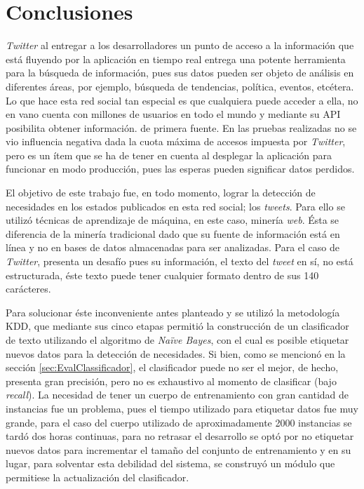 \chapter{Conclusiones}
\label{cap:conclusiones}

\textit{Twitter} al entregar a los desarrolladores un punto de acceso a la información que está fluyendo por la aplicación en tiempo real entrega una potente herramienta para la búsqueda de información, pues sus datos pueden ser objeto de análisis en diferentes áreas, por ejemplo, búsqueda de tendencias, política, eventos, etcétera. Lo que hace esta red social tan especial es que cualquiera puede acceder a ella, no en vano cuenta con millones de usuarios en todo el mundo y mediante su API posibilita obtener información. de primera fuente. En las pruebas realizadas no se vio influencia negativa dada la cuota máxima de accesos impuesta por \textit{Twitter}, pero es un ítem que se ha de tener en cuenta al desplegar la aplicación para funcionar en modo producción, pues las esperas pueden significar datos perdidos.

El objetivo de este trabajo fue, en todo momento, lograr la detección de necesidades en los estados publicados en esta red social; los \textit{tweets}. Para ello se utilizó técnicas de aprendizaje de máquina, en este caso, minería \textit{web}. Ésta se diferencia de la minería tradicional dado que su fuente de información está en línea y no en bases de datos almacenadas para ser analizadas. Para el caso de \textit{Twitter}, presenta un desafío pues su información, el texto del \textit{tweet} en sí, no está estructurada, éste texto puede tener cualquier formato dentro de sus 140 carácteres. 

Para solucionar éste inconveniente antes planteado y se utilizó la metodología KDD, que mediante sus cinco etapas permitió la construcción de un clasificador de texto utilizando el algoritmo de \textit{Naïve Bayes}, con el cual es posible etiquetar nuevos datos para la detección de necesidades. Si bien, como se mencionó en la sección \ref{sec:EvalClassificador}, el clasificador puede no ser el mejor, de hecho, presenta gran precisión, pero no es exhaustivo al momento de clasificar (bajo \textit{recall}). La necesidad de tener un cuerpo de entrenamiento con gran cantidad de instancias fue un problema, pues el tiempo utilizado para etiquetar datos fue muy grande, para el caso del cuerpo utilizado de aproximadamente 2000 instancias se tardó dos horas continuas, para no retrasar el desarrollo se optó por no etiquetar nuevos datos para incrementar el tamaño del conjunto de entrenamiento y en su lugar, para solventar esta debilidad del sistema, se construyó un módulo que permitiese la actualización del clasificador.

